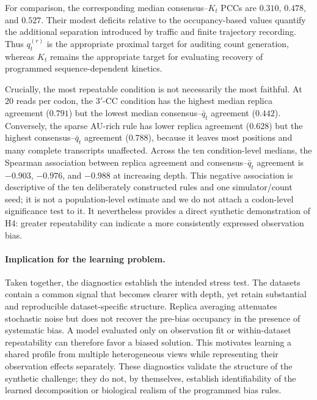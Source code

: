 For comparison, the corresponding median consensus--$K_t$ PCCs are $0.310$,
$0.478$, and $0.527$.  Their modest deficits relative to the occupancy-based
values quantify the additional separation introduced by traffic and finite
trajectory recording.  Thus $q_t^{(r)}$ is the appropriate proximal target
for auditing count generation, whereas $K_t$ remains the appropriate target
for evaluating recovery of programmed sequence-dependent kinetics.

Crucially, the most repeatable condition is not necessarily the most faithful.
At $20$ reads per codon, the $3'$-CC condition has the highest median replica
agreement ($0.791$) but the lowest median consensus--$\bar q_t$ agreement ($0.442$).
Conversely, the sparse AU-rich rule has lower replica agreement ($0.628$) but
the highest consensus--$\bar q_t$ agreement ($0.788$), because it leaves most
positions and many complete transcripts unaffected.  Across the ten
condition-level medians, the Spearman association between replica agreement
and consensus--$\bar q_t$ agreement is $-0.903$, $-0.976$, and $-0.988$ at increasing
depth.  This negative association is descriptive of the ten deliberately
constructed rules and one simulator/count seed; it is not a population-level
estimate and we do not attach a codon-level significance test to it.  It
nevertheless provides a direct synthetic demonstration of H4: greater
repeatability can indicate a more consistently expressed observation bias.

\paragraph{Implication for the learning problem.}
Taken together, the diagnostics establish the intended stress test.  The
datasets contain a common signal that becomes clearer with depth, yet retain
substantial and reproducible dataset-specific structure.  Replica averaging
attenuates stochastic noise but does not recover the pre-bias occupancy in the
presence of systematic bias.  A model evaluated only on observation fit
or within-dataset repeatability can therefore favor a biased solution.  This
motivates learning a shared profile from multiple heterogeneous views while
representing their observation effects separately.  These diagnostics validate
the structure of the synthetic challenge; they do not, by themselves,
establish identifiability of the learned decomposition or biological realism
of the programmed bias rules.

